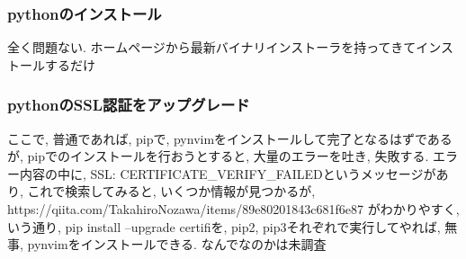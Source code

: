 \documentclass{jsarticle}
\begin{document}
\subsubsection{pythonのインストール}
全く問題ない. ホームページから最新バイナリインストーラを持ってきてインストールするだけ

\subsubsection{pythonのSSL認証をアップグレード}
ここで, 普通であれば, pipで, pynvimをインストールして完了となるはずであるが, pipでのインストールを行おうとすると, 大量のエラーを吐き, 失敗する. 
エラー内容の中に, SSL: CERTIFICATE\_VERIFY\_FAILEDというメッセージがあり, これで検索してみると, いくつか情報が見つかるが, 
https://qiita.com/TakahiroNozawa/items/89e80201843c681f6e87
がわかりやすく, いう通り, pip install --upgrade certifiを, pip2, pip3それぞれで実行してやれば, 無事, pynvimをインストールできる. 
なんでなのかは未調査
\end{document}
